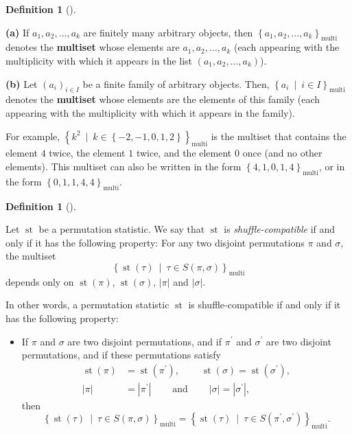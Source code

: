 \documentclass[numbers=enddot,12pt,final,onecolumn,notitlepage]{scrartcl}%
\theoremstyle{definition}
\newtheorem{defi}[theo]{Definition}
\newenvironment{definition}[1][]
{\begin{defi}[#1]\begin{leftbar}}
{\end{leftbar}\end{defi}}
\begin{document}
\begin{definition}
\textbf{(a)} If $a_{1},a_{2},\ldots,a_{k}$ are finitely many arbitrary
objects, then $\left\{  a_{1},a_{2},\ldots,a_{k}\right\}
_{\operatorname*{multi}}$ denotes the \textbf{multiset} whose elements are
$a_{1},a_{2},\ldots,a_{k}$ (each appearing with the multiplicity with which it
appears in the list $\left(  a_{1},a_{2},\ldots,a_{k}\right)  $).

\textbf{(b)} Let $\left(  a_{i}\right)  _{i\in I}$ be a finite family of
arbitrary objects. Then, $\left\{  a_{i}\ \mid\ i\in I\right\}
_{\operatorname*{multi}}$ denotes the \textbf{multiset} whose elements are the
elements of this family (each appearing with the multiplicity with which it
appears in the family).
\end{definition}

For example, $\left\{  k^{2}\ \mid\ k\in\left\{  -2,-1,0,1,2\right\}
\right\}  _{\operatorname*{multi}}$ is the multiset that contains the element
$4$ twice, the element $1$ twice, and the element $0$ once (and no other
elements). This multiset can also be written in the form $\left\{
4,1,0,1,4\right\}  _{\operatorname*{multi}}$, or in the form $\left\{
0,1,1,4,4\right\}  _{\operatorname*{multi}}$.

\begin{definition}
Let $\operatorname*{st}$ be a permutation statistic. We say that
$\operatorname*{st}$ is \textit{shuffle-compatible} if and only if it has the
following property: For any two disjoint permutations $\pi$ and $\sigma$, the
multiset%
\[
\left\{  \operatorname*{st}\left(  \tau\right)  \ \mid\ \tau\in S\left(
\pi,\sigma\right)  \right\}  _{\operatorname*{multi}}%
\]
depends only on $\operatorname*{st}\left(  \pi\right)  $, $\operatorname*{st}%
\left(  \sigma\right)  $, $\left\vert \pi\right\vert $ and $\left\vert
\sigma\right\vert $.
\end{definition}

In other words, a permutation statistic $\operatorname*{st}$ is
shuffle-compatible if and only if it has the following property:

\begin{itemize}
\item If $\pi$ and $\sigma$ are two disjoint permutations, and if $\pi
^{\prime}$ and $\sigma^{\prime}$ are two disjoint permutations, and if these
permutations satisfy%
\begin{align*}
\operatorname*{st}\left(  \pi\right)   &  =\operatorname*{st}\left(
\pi^{\prime}\right)  ,\ \ \ \ \ \ \ \ \ \ \operatorname*{st}\left(
\sigma\right)  =\operatorname*{st}\left(  \sigma^{\prime}\right)  ,\\
\left\vert \pi\right\vert  &  =\left\vert \pi^{\prime}\right\vert
\ \ \ \ \ \ \ \ \ \ \text{and}\ \ \ \ \ \ \ \ \ \ \left\vert \sigma\right\vert
=\left\vert \sigma^{\prime}\right\vert ,
\end{align*}
then
\[
\left\{  \operatorname*{st}\left(  \tau\right)  \ \mid\ \tau\in S\left(
\pi,\sigma\right)  \right\}  _{\operatorname*{multi}}=\left\{
\operatorname*{st}\left(  \tau\right)  \ \mid\ \tau\in S\left(  \pi^{\prime
},\sigma^{\prime}\right)  \right\}  _{\operatorname*{multi}}.
\]

\end{itemize}
\end{document}
